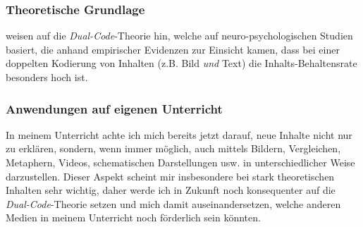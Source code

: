 \begin{myExBox}[title=\textit{Dual-Code}-Theorie \& Multi-Modalität im Unterricht]
\subsubsection*{Theoretische Grundlage}
\textcite{alma99116838938605511} weisen auf die \textit{Dual-Code}-Theorie hin, welche auf neuro-psychologischen Studien basiert, die anhand empirischer Evidenzen zur Einsicht kamen, dass bei einer doppelten Kodierung von Inhalten (z.B. Bild \textit{und} Text) die Inhalts-Behaltensrate besonders hoch ist.
\subsubsection*{Anwendungen auf eigenen Unterricht}
In meinem Unterricht achte ich mich bereits jetzt darauf, neue Inhalte nicht nur zu erklären, sondern, wenn immer möglich, auch mittels Bildern, Vergleichen, Metaphern, Videos, schematischen Darstellungen usw. in unterschiedlicher Weise darzustellen. Dieser Aspekt scheint mir insbesondere bei stark theoretischen Inhalten sehr wichtig, daher werde ich in Zukunft noch konsequenter auf die \textit{Dual-Code}-Theorie setzen und mich damit auseinandersetzen, welche anderen Medien in meinem Unterricht noch förderlich sein könnten.
\end{myExBox}

